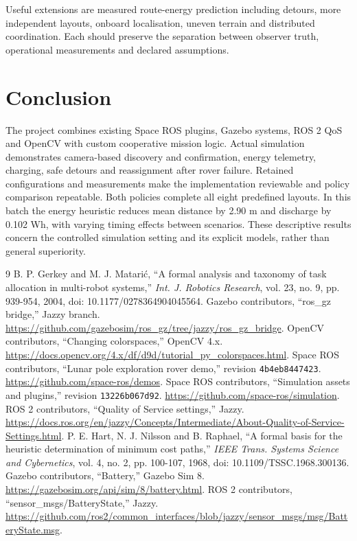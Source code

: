 \documentclass[conference]{IEEEtran}
\begin{document}
Useful extensions are measured route-energy prediction including detours,
more independent layouts, onboard localisation, uneven terrain and distributed
coordination. Each should preserve the separation between observer truth,
operational measurements and declared assumptions.

\section{Conclusion}
The project combines existing Space ROS plugins, Gazebo systems, ROS 2 QoS and
OpenCV with custom cooperative mission logic. Actual simulation demonstrates
camera-based discovery and confirmation, energy telemetry, charging, safe detours
and reassignment after rover failure. Retained configurations and measurements
make the implementation reviewable and policy comparison repeatable.
Both policies complete all eight predefined layouts. In this batch the energy
heuristic reduces mean distance by 2.90 m and discharge by 0.102 Wh, with varying
timing effects between scenarios. These descriptive results concern the controlled
simulation setting and its explicit models, rather than general superiority.

\balance
\begin{thebibliography}{9}
 B. P. Gerkey and M. J. Matari\'c, ``A formal analysis and taxonomy
of task allocation in multi-robot systems,'' \emph{Int. J. Robotics Research},
vol. 23, no. 9, pp. 939-954, 2004, doi: 10.1177/0278364904045564.
 Gazebo contributors, ``ros\_gz bridge,'' Jazzy branch.
\url{https://github.com/gazebosim/ros_gz/tree/jazzy/ros_gz_bridge}.
 OpenCV contributors, ``Changing colorspaces,'' OpenCV 4.x.
\url{https://docs.opencv.org/4.x/df/d9d/tutorial_py_colorspaces.html}.
 Space ROS contributors, ``Lunar pole exploration rover
demo,'' revision \texttt{4b4eb8447423}.
\url{https://github.com/space-ros/demos}.
 Space ROS contributors, ``Simulation assets and plugins,''
revision \texttt{13226b067d92}. \url{https://github.com/space-ros/simulation}.
 ROS 2 contributors, ``Quality of Service settings,'' Jazzy.
\url{https://docs.ros.org/en/jazzy/Concepts/Intermediate/About-Quality-of-Service-Settings.html}.
 P. E. Hart, N. J. Nilsson and B. Raphael, ``A formal basis for
the heuristic determination of minimum cost paths,'' \emph{IEEE Trans. Systems
Science and Cybernetics}, vol. 4, no. 2, pp. 100-107, 1968,
doi: 10.1109/TSSC.1968.300136.
 Gazebo contributors, ``Battery,'' Gazebo Sim 8.
\url{https://gazebosim.org/api/sim/8/battery.html}.
 ROS 2 contributors, ``sensor\_msgs/BatteryState,'' Jazzy.
\url{https://github.com/ros2/common_interfaces/blob/jazzy/sensor_msgs/msg/BatteryState.msg}.
\end{thebibliography}
\end{document}
